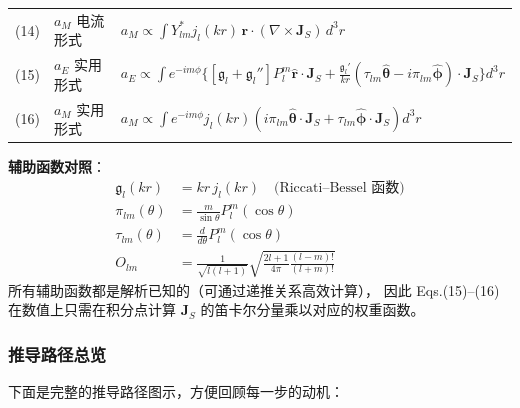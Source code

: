 \begin{table}[htbp]
\begin{tabular}{p{1.6cm}p{3.2cm}p{9.5cm}}
(14) & $a_M$ 电流形式 & $\displaystyle a_M \propto \int Y_{lm}^*j_l(kr)\,\mathbf{r}\cdot(\nabla\times\mathbf{J}_S)\,d^3r$ \\[1em]
(15) & $a_E$ 实用形式 & $\displaystyle a_E \propto \int e^{-im\phi}\bigl\{
  [\mathfrak{g}_l+\mathfrak{g}_l'']P_l^m\hat{\mathbf{r}}\cdot\mathbf{J}_S + \frac{\mathfrak{g}_l'}{kr}(\tau_{lm}\hat{\boldsymbol{\theta}}-i\pi_{lm}\hat{\boldsymbol{\phi}})\cdot\mathbf{J}_S\bigr\}d^3r$ \\[1em]
(16) & $a_M$ 实用形式 & $\displaystyle a_M \propto \int e^{-im\phi}j_l(kr)(i\pi_{lm}\hat{\boldsymbol{\theta}}\cdot\mathbf{J}_S + \tau_{lm}\hat{\boldsymbol{\phi}}\cdot\mathbf{J}_S)d^3r$ \\
\bottomrule
\end{tabular}
\end{table}

\begin{noteworthy}
\textbf{辅助函数对照}：
\begin{align*}
  \mathfrak{g}_l(kr) &= kr\,j_l(kr) \quad\text{(Riccati--Bessel 函数)} \\
  \pi_{lm}(\theta) &= \frac{m}{\sin\theta}P_l^m(\cos\theta) \\
  \tau_{lm}(\theta) &= \frac{d}{d\theta}P_l^m(\cos\theta) \\
  O_{lm} &= \frac{1}{\sqrt{l(l+1)}}\sqrt{\frac{2l+1}{4\pi}\frac{(l-m)!}{(l+m)!}}
\end{align*}
所有辅助函数都是解析已知的（可通过递推关系高效计算），
因此 Eqs.(15)--(16) 在数值上只需在积分点计算 $\mathbf{J}_S$ 的笛卡尔分量乘以对应的权重函数。
\end{noteworthy}

\subsubsection*{推导路径总览}

下面是完整的推导路径图示，方便回顾每一步的动机：

